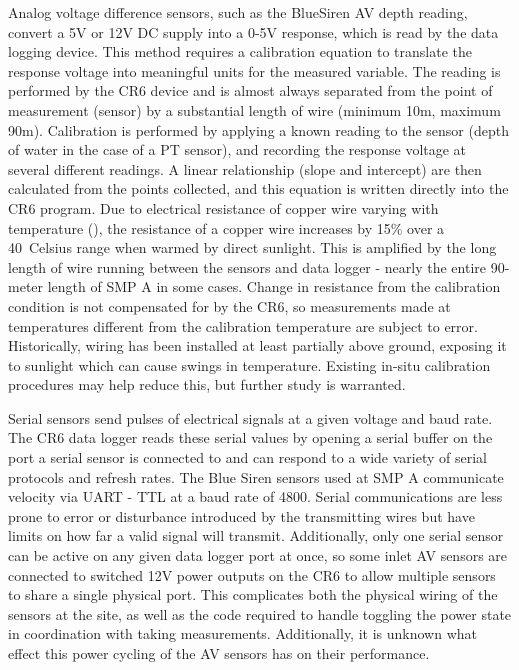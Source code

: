 Analog voltage difference sensors, such as the BlueSiren AV depth reading, convert a 5V or 12V DC supply into a 0-5V response, which is read by the data logging device.
This method requires a calibration equation to translate the response voltage into meaningful units for the measured variable.
The reading is performed by the CR6 device and is almost always separated from the point of measurement (sensor) by a substantial length of wire (minimum 10m, maximum 90m).
Calibration is performed by applying a known reading to the sensor (depth of water in the case of a PT sensor), and recording the response voltage at several different readings.
A linear relationship (slope and intercept) are then calculated from the points collected, and this equation is written directly into the CR6 program.
Due to electrical resistance of copper wire varying with temperature (\cite{Eargle2002}), the resistance of a copper wire increases by 15\% over a 40\degree\ Celsius range when warmed by direct sunlight.
This is amplified by the long length of wire running between the sensors and data logger - nearly the entire 90-meter length of SMP A in some cases.
Change in resistance from the calibration condition is not compensated for by the CR6, so measurements made at temperatures different from the calibration temperature are subject to error.
Historically, wiring has been installed at least partially above ground, exposing it to sunlight which can cause swings in temperature.
Existing in-situ calibration procedures may help reduce this, but further study is warranted.

Serial sensors send pulses of electrical signals at a given voltage and baud rate.
The CR6 data logger reads these serial values by opening a serial buffer on the port a serial sensor is connected to and can respond to a wide variety of serial protocols and refresh rates.
The Blue Siren sensors used at SMP A communicate velocity via UART - TTL at a baud rate of 4800.
Serial communications are less prone to error or disturbance introduced by the transmitting wires but have limits on how far a valid signal will transmit.
Additionally, only one serial sensor can be active on any given data logger port at once, so some inlet AV sensors are connected to switched 12V power outputs on the CR6 to allow multiple sensors to share a single physical port.
This complicates both the physical wiring of the sensors at the site, as well as the code required to handle toggling the power state in coordination with taking measurements.
Additionally, it is unknown what effect this power cycling of the AV sensors has on their performance.

